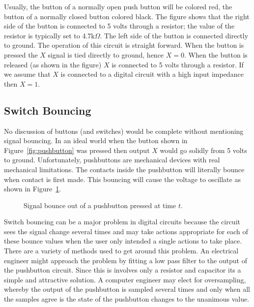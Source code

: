 Usually, the button of a normally open push button will be colored
red, the button of a normally closed button colored black.
The figure shows that the right side of the button is connected to 
5 volts through a resistor; the value of the resistor is typically
set to 4.7k$\Omega$.  The left side of the button is connected directly 
to ground.  The operation of this circuit is straight forward.  When 
the button is pressed the $X$ signal is tied directly to ground,
hence $X=0$.  When the button is released (as shown in the figure) 
$X$ is connected to 5 volts through a resistor.  If we assume that
$X$ is connected to a digital circuit with a high input impedance 
then $X=1$.  

\subsection{Switch Bouncing}
No discussion of buttons (and switches) would be complete without
mentioning signal bouncing.  In an ideal world when the button
shown in Figure~\ref{fig:pushbutton} was pressed then output $X$
would go solidly from 5 volts to ground.  Unfortunately, pushbuttons
are mechanical devices with real mechanical limitations.  The contacts
inside the pushbutton will literally bounce when contact is first 
made.  This bouncing will cause the voltage to oscillate as shown
in Figure~\ref{fig:bounce}.

\begin{figure}[ht]
\caption{Signal bounce out of a pushbutton pressed at time $t$.}
\label{fig:bounce}
\end{figure}

Switch bouncing can be a major problem in digital circuits because
the circuit sees the signal change several times and may take 
actions appropriate for each of these bounce values when the user
only intended a single actions to take place.  There are a variety of
methods used to get around this problem.  An electrical engineer
might approach the problem by fitting a low pass filter to the 
output of the pushbutton circuit.  Since this is involves only a
resistor and capacitor its a simple and attractive solution.  A 
computer engineer may elect for oversampling, whereby the output
of the pushbutton is sampled several times and only when all the
samples agree is the state of the pushbutton changes to the 
unanimous value.


